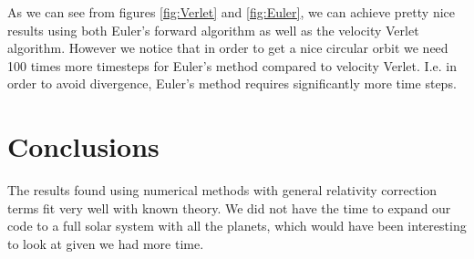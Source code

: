 \documentclass[a4paper, fontsize=11pt]{article}
\begin{document}
As we can see from figures \ref{fig:Verlet} and \ref{fig:Euler}, we can achieve pretty nice results using both Euler's forward algorithm as well as the velocity Verlet algorithm. However we notice that in order to get a nice circular orbit we need 100 times more timesteps for Euler's method compared to velocity Verlet. I.e. in order to avoid divergence, Euler's method requires significantly more time steps.




\section{Conclusions}

The results found using numerical methods with general relativity correction terms fit very well with known theory. We did not have the time to expand our code to a full solar system with all the planets, which would have been interesting to look at given we had more time.




\end{document}
